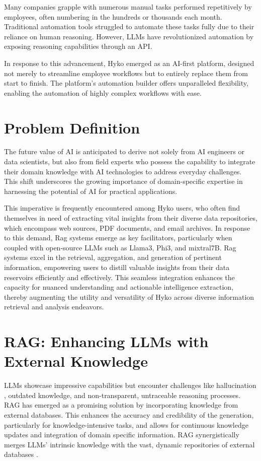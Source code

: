 Many companies grapple with numerous manual tasks performed repetitively by employees, often numbering in the hundreds or thousands each month. Traditional automation tools struggled to automate these tasks fully due to their reliance on human reasoning. However, LLMs have revolutionized automation by exposing reasoning capabilities through an API.

In response to this advancement, Hyko emerged as an AI-first platform, designed not merely to streamline employee workflows but to entirely replace them from start to finish. The platform's automation builder offers unparalleled flexibility, enabling the automation of highly complex workflows with ease.


\section{Problem Definition}

The future value of AI is anticipated to derive not solely from AI engineers or data scientists, but also from field experts who possess the capability to integrate their domain knowledge with AI technologies to address everyday challenges. This shift underscores the growing importance of domain-specific expertise in harnessing the potential of AI for practical applications.

This imperative is frequently encountered among Hyko users, who often find themselves in need of extracting vital insights from their diverse data repositories, which encompass web sources, PDF documents, and email archives. In response to this demand, Rag systems emerge as key facilitators, particularly when coupled with open-source LLMs such as Llama3, Phi3, and mixtral7B. Rag systems excel in the retrieval, aggregation, and generation of pertinent information, empowering users to distill valuable insights from their data reservoirs efficiently and effectively. This seamless integration enhances the capacity for nuanced understanding and actionable intelligence extraction, thereby augmenting the utility and versatility of Hyko across diverse information retrieval and analysis endeavors.

\section{RAG: Enhancing LLMs with External Knowledge}

LLMs showcase impressive capabilities but encounter challenges like hallucination \cite{zhang2023sirens}, outdated knowledge, and non-transparent, untraceable reasoning processes. RAG has emerged as a promising solution by incorporating knowledge from external databases. This enhances the accuracy and credibility of the generation, particularly for knowledge-intensive tasks, and allows for continuous knowledge updates and integration of domain specific information. RAG synergistically merges LLMs' intrinsic knowledge with the vast, dynamic repositories of external databases \cite{gao2024retrievalaugmented}.

